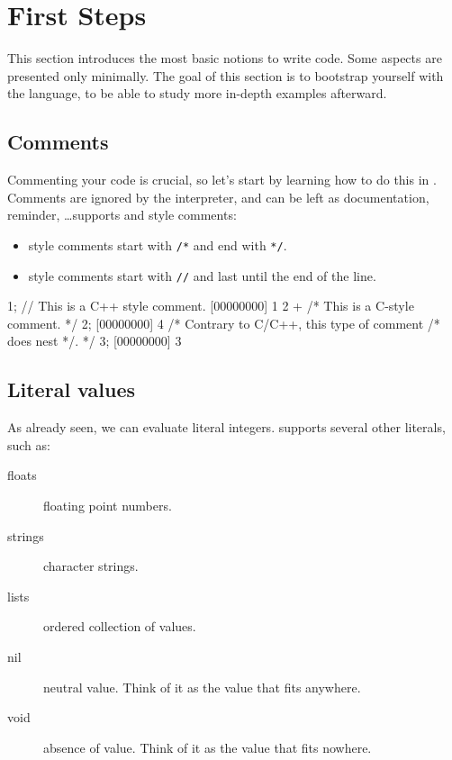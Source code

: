 \chapter{First Steps}
\label{sec:tut:first}
This section introduces the most basic notions to write \us code. Some
aspects are presented only minimally.  The goal of this section is to
bootstrap yourself with the \us language, to be able to study more
in-depth examples afterward.

\section{Comments}

Commenting your code is crucial, so let's start by learning how to do
this in \us. Comments are ignored by the interpreter, and
can be left as documentation, reminder, \ldots \us supports \C and
\Cxx style comments:

\begin{itemize}
\item \C style comments start with \texttt{/*} and end with \texttt{*/}.
\item \Cxx style comments start with \texttt{//} and last until the
  end of the line.
\end{itemize}

\begin{urbiscript}
1; // This is a C++ style comment.
[00000000] 1
2 + /* This is a C-style comment. */ 2;
[00000000] 4
/* Contrary to C/C++, this type of comment /* does nest */. */
3;
[00000000] 3
\end{urbiscript}


\section{Literal values}

As already seen, we can evaluate literal integers. \us supports
several other literals, such as:

\begin{description}
\item[floats] floating point numbers.
\item[strings] character strings.
\item[lists] ordered collection of values.
\item[nil] neutral value. Think of it as the value that fits anywhere.
\item[void] absence of value. Think of it as the value that fits nowhere.
\end{description}

